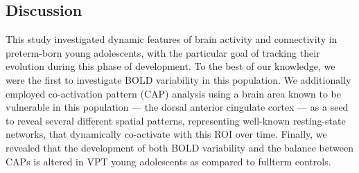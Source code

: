 \subsection{Discussion}

This study investigated dynamic features of brain activity and connectivity in preterm-born young adolescents, with the particular goal of tracking their evolution during this phase of development. To the best of our knowledge, we were the first to investigate BOLD variability in this population.  We additionally employed co-activation pattern (CAP) analysis using a brain area known to be vulnerable in this population --- the dorsal anterior cingulate cortex --- as a seed to reveal several different spatial patterns, representing well-known resting-state networks, that dynamically co-activate with this ROI over time. Finally, we revealed that the development of both BOLD variability and the balance between CAPs is altered in VPT young adolescents as compared to fullterm controls. 


